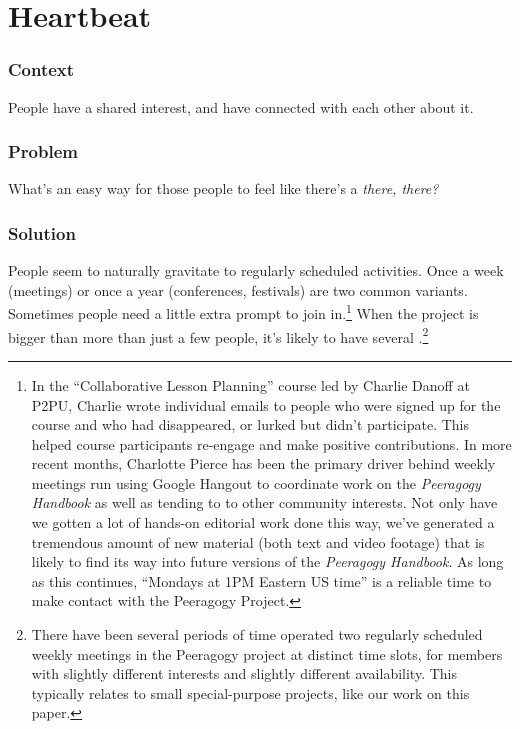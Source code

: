 \section{Heartbeat}\label{sec:Heartbeat}

\subsubsection*{Context}
People have a shared interest, and have connected with each other about it.

\subsubsection*{Problem} What's an easy way for those people to feel like there's a \emph{there, there?}

\subsubsection*{Solution} People seem to naturally gravitate to regularly scheduled
activities. Once a week (meetings) or once a year (conferences, festivals) are two common variants.  Sometimes people need a little extra prompt to join in.\footnote{In the ``Collaborative Lesson Planning'' course led
by Charlie Danoff at P2PU, Charlie wrote individual emails to people who
were signed up for the course and who had disappeared, or lurked but
didn't participate. This helped course participants
re-engage and make positive contributions. In more recent
months, Charlotte Pierce has been the primary driver behind weekly meetings run using Google
Hangout to coordinate work on the \emph{Peeragogy Handbook} as well as tending to to other community interests. Not only have we
gotten a lot of hands-on editorial work done this way, we've generated a
tremendous amount of new material (both text and video footage) that is
likely to find its way into future versions of the \emph{Peeragogy Handbook}.  As long as this continues, ``Mondays at 1PM Eastern US time'' is a reliable time to make contact with the Peeragogy Project.}  When the project is bigger than more than just a few people, it's likely to have several .\footnote{There have been several periods of time operated two regularly scheduled weekly meetings in the Peeragogy project at distinct time slots, for members with slightly different interests and slightly different availability.  This typically relates to small special-purpose projects, like our work on this paper.}  

